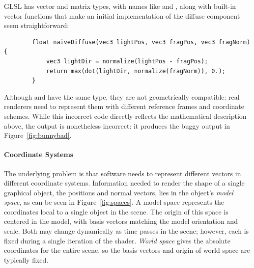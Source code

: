 \documentclass[../main.tex]{subfiles}
\begin{document}
	GLSL has vector and matrix types, with names like  and , along with built-in vector functions that make an initial implementation of the diffuse component seem straightforward:
	\begin{lstlisting}
		float naiveDiffuse(vec3 lightPos, vec3 fragPos, vec3 fragNorm) {
			vec3 lightDir = normalize(lightPos - fragPos);
			return max(dot(lightDir, normalize(fragNorm)), 0.);
		}
	\end{lstlisting}
	Although  and  have the same type, they are not geometrically compatible: real renderers need to represent them with different reference frames and coordinate schemes.
	While this incorrect code directly reflects the mathematical description above, the output is nonetheless incorrect:
	it produces the buggy output in Figure~\ref{fig:bunnybad}.
	
	
	\paragraph{Coordinate Systems}
	The underlying problem is that software needs to represent different vectors in different coordinate systems.
	Information needed to render the shape of a single graphical object, the positions and normal vectors, lies in the object's \emph{model space}, as can be seen in Figure~\ref{fig:spaces}.
	A model space represents the coordinates local to a single object in the scene.
	The origin of this space is centered in the model, with basis vectors matching the model orientation and scale.
	Both may change dynamically as time passes in the scene; however, each is fixed during a single iteration of the shader.
	\emph{World space} gives the absolute coordinates for the entire scene, so the basis vectors and origin of world space are typically fixed.
	
\end{document}
